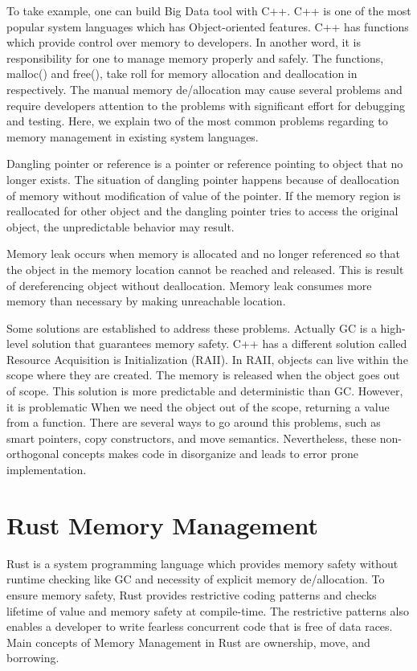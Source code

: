 To take example, one can build Big Data tool with C++. C++ is one of the most popular system languages which has Object-oriented features. 
C++ has functions which provide control over memory to developers. In another word, it is responsibility for one to manage memory properly and safely. 
The functions, malloc() and free(), take roll for memory allocation and deallocation in respectively. The manual memory de/allocation may cause several problems and require developers 
attention to the problems with significant effort for debugging and testing. Here, we explain two of the most common problems regarding to memory management in existing system languages.

Dangling pointer or reference is a pointer or reference pointing to object that no longer exists. The situation of dangling pointer happens 
because of deallocation of memory without modification of value of the pointer. 
If the memory region is reallocated for other object and the dangling pointer tries to access the original object, the unpredictable behavior may result. 

Memory leak occurs when memory is allocated and no longer referenced so that the object in the memory location cannot be reached and released.
This is result of dereferencing object without deallocation. Memory leak consumes more memory than necessary by making unreachable location.

Some solutions are established to address these problems. Actually GC is a high-level solution that guarantees memory safety. 
C++ has a different solution called Resource Acquisition is Initialization (RAII). In RAII, objects can live within the scope where they are created. 
The memory is released when the object goes out of scope. This solution is more predictable and deterministic than GC. 
However, it is problematic When we need the object out of the scope, returning a value from a function. 
There are several ways to go around this problems, such as smart pointers, copy constructors, and move semantics. 
Nevertheless, these non-orthogonal concepts makes code in disorganize and leads to error prone implementation. 


\section{Rust Memory Management}
\label{sec:history}
Rust is a system programming language which provides memory safety without runtime checking like GC and necessity of explicit memory de/allocation. 
To ensure memory safety, Rust provides restrictive coding patterns and checks lifetime of value and memory safety at compile-time.
The restrictive patterns also enables a developer to write fearless concurrent code that is free of data races.
Main concepts of Memory Management in Rust are ownership, move, and borrowing.

